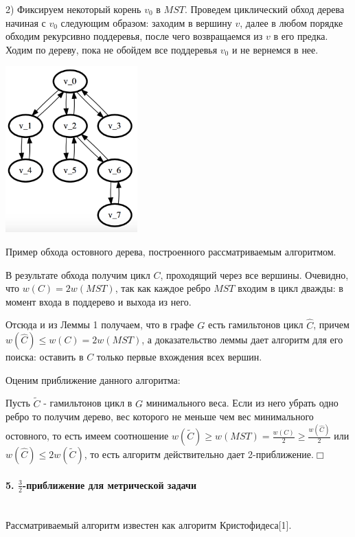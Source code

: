 \documentclass[14pt]{article}
\begin{document}
    2) Фиксируем некоторый корень $v_0$ в $MST$. Проведем циклический обход дерева начиная с $v_0$ следующим образом: заходим в вершину $v$, далее в любом порядке обходим рекурсивно поддеревья, после чего возвращаемся из $v$ в его предка. Ходим по дереву, пока не обойдем все поддеревья $v_0$ и не вернемся в нее.

    \begin{center} 
        \includegraphics[width=2in]{1.png}

        \caption{Пример обхода остовного дерева,  построенного рассматриваемым алгоритмом.}
    \end{center}

    В результате обхода получим цикл  $C$, проходящий через все вершины. Очевидно, что $w(C) = 2w(MST)$, так как каждое ребро $MST$ входим в цикл дважды: в момент входа в поддерево и выхода из него. 

    Отсюда и из Леммы 1 получаем, что в графе $G$ есть гамильтонов цикл $\hat{C}$, причем $w(\hat{C}) \leq w(C) = 2w(MST)$, а доказательство леммы дает алгоритм для его поиска: оставить в $C$ только первые вхождения всех вершин. 

    Оценим приближение данного алгоритма:

    Пусть $\tilde{C}$ - гамильтонов цикл в $G$ минимального веса.
    Если из него убрать одно ребро то получим дерево, вес которого не меньше чем вес минимального остовного, то есть имеем соотношение $w(\tilde{C}) \geq w(MST) = \frac{w(C)}{2} \geq \frac{w(\hat{C})}{2}$ или $w(\hat{C}) \leq 2w(\tilde{C})$, то есть алгоритм действительно дает 2-приближение$.\Box$
    \paragraph{\large{5. $\frac{3}{2}$-приближение для метрической задачи}}\mbox{}\\
    Рассматриваемый алгоритм известен как алгоритм Кристофидеса[1].
\end{document}
